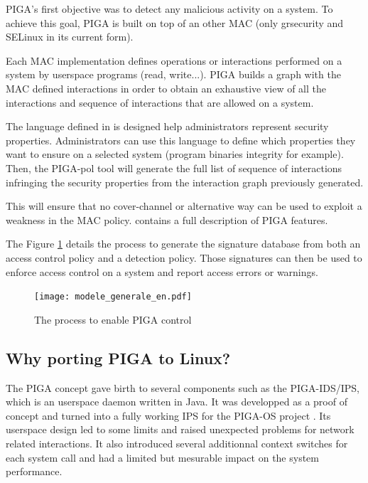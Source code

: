 \documentclass[pdftex,a4paper,titlepage,11pt]{article}
\begin{document}
PIGA's first objective was to detect any malicious activity on a system. To
achieve this goal, PIGA is built on top of an other MAC (only grsecurity
and SELinux in its current form).

\bigskip

Each MAC implementation defines operations or interactions performed on a
system by userspace programs (read, write...). PIGA  builds a graph with the
MAC defined interactions in order to obtain an exhaustive view of all the
interactions and sequence of interactions that are allowed on a system.

\bigskip

The language defined in \cite{theseJBriffaut} is designed help administrators
represent security properties. Administrators can use this language to define
which properties they want to ensure on a selected system (program binaries
integrity for example). Then, the PIGA-pol tool will generate the full list of
sequence of interactions infringing the security properties from the
interaction graph previously generated.

\bigskip

This will ensure that no cover-channel or alternative way can be used to
exploit a weakness in the MAC policy. \cite{theseJBriffaut} contains a full
description of PIGA features.

\bigskip

The Figure \ref{PIGAARCHI} details the process to generate the signature
database from both an access control policy and a detection policy. Those
signatures can then be used to enforce access control on a system and report
access errors or warnings.

\begin{figure}[h]
	\centering
	\texttt{[image: modele\_generale\_en.pdf]}
	\caption{The process to enable PIGA control}
	\label{PIGAARCHI}
\end{figure}

\subsection{Why porting PIGA to Linux?}

The PIGA concept gave birth to several components such as the PIGA-IDS/IPS,
which is an userspace daemon written in Java. It was developped as a proof of
concept and turned into a fully working IPS for the PIGA-OS project
\cite{pigaosdefisecurite2011}. Its userspace design led to some limits and
raised unexpected problems for network related interactions. It also introduced
several additionnal context switches for each system call and had a limited but
mesurable impact on the system performance.
\end{document}

